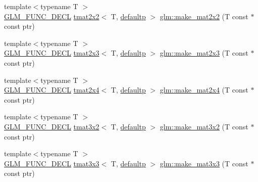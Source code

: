\begin{DoxyCompactItemize}
\item 
{\footnotesize template$<$typename T $>$ }\\\mbox{\hyperlink{setup_8hpp_ab2d052de21a70539923e9bcbf6e83a51}{G\+L\+M\+\_\+\+F\+U\+N\+C\+\_\+\+D\+E\+CL}} \mbox{\hyperlink{structglm_1_1tmat2x2}{tmat2x2}}$<$ T, \mbox{\hyperlink{namespaceglm_a0f04f086094c747d227af4425893f545a9d21ccd8b5a009ec7eb7677befc3bf51}{defaultp}} $>$ \mbox{\hyperlink{group__gtc__type__ptr_gadb29e510762e1042069cb28bf24ae990}{glm\+::make\+\_\+mat2x2}} (T const $\ast$const ptr)
\item 
{\footnotesize template$<$typename T $>$ }\\\mbox{\hyperlink{setup_8hpp_ab2d052de21a70539923e9bcbf6e83a51}{G\+L\+M\+\_\+\+F\+U\+N\+C\+\_\+\+D\+E\+CL}} \mbox{\hyperlink{structglm_1_1tmat2x3}{tmat2x3}}$<$ T, \mbox{\hyperlink{namespaceglm_a0f04f086094c747d227af4425893f545a9d21ccd8b5a009ec7eb7677befc3bf51}{defaultp}} $>$ \mbox{\hyperlink{group__gtc__type__ptr_ga37988c6dd941f617cdfab86d54375fc1}{glm\+::make\+\_\+mat2x3}} (T const $\ast$const ptr)
\item 
{\footnotesize template$<$typename T $>$ }\\\mbox{\hyperlink{setup_8hpp_ab2d052de21a70539923e9bcbf6e83a51}{G\+L\+M\+\_\+\+F\+U\+N\+C\+\_\+\+D\+E\+CL}} \mbox{\hyperlink{structglm_1_1tmat2x4}{tmat2x4}}$<$ T, \mbox{\hyperlink{namespaceglm_a0f04f086094c747d227af4425893f545a9d21ccd8b5a009ec7eb7677befc3bf51}{defaultp}} $>$ \mbox{\hyperlink{group__gtc__type__ptr_ga6dfb2ac10859b0cc8e3893ea84fa95b5}{glm\+::make\+\_\+mat2x4}} (T const $\ast$const ptr)
\item 
{\footnotesize template$<$typename T $>$ }\\\mbox{\hyperlink{setup_8hpp_ab2d052de21a70539923e9bcbf6e83a51}{G\+L\+M\+\_\+\+F\+U\+N\+C\+\_\+\+D\+E\+CL}} \mbox{\hyperlink{structglm_1_1tmat3x2}{tmat3x2}}$<$ T, \mbox{\hyperlink{namespaceglm_a0f04f086094c747d227af4425893f545a9d21ccd8b5a009ec7eb7677befc3bf51}{defaultp}} $>$ \mbox{\hyperlink{group__gtc__type__ptr_gabe1e5066608a66da7a94f802b57b4eed}{glm\+::make\+\_\+mat3x2}} (T const $\ast$const ptr)
\item 
{\footnotesize template$<$typename T $>$ }\\\mbox{\hyperlink{setup_8hpp_ab2d052de21a70539923e9bcbf6e83a51}{G\+L\+M\+\_\+\+F\+U\+N\+C\+\_\+\+D\+E\+CL}} \mbox{\hyperlink{structglm_1_1tmat3x3}{tmat3x3}}$<$ T, \mbox{\hyperlink{namespaceglm_a0f04f086094c747d227af4425893f545a9d21ccd8b5a009ec7eb7677befc3bf51}{defaultp}} $>$ \mbox{\hyperlink{group__gtc__type__ptr_ga3cbe7adf857c867cee77eae4617abadd}{glm\+::make\+\_\+mat3x3}} (T const $\ast$const ptr)

\end{DoxyCompactItemize}
